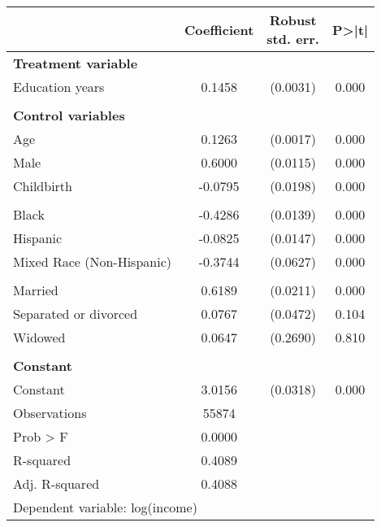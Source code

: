 {
\def\sym#1{\ifmmode^{#1}\else\(^{#1}\)\fi}
\begin{tabular}{l*{1}{ccc}}
\toprule
                    & Coefficient&\shortstack{Robust\\std. err.}&       P>|t|\\
\midrule
\textbf{Treatment variable}&            &            &            \\
Education years     &      0.1458&    (0.0031)&       0.000\\
\\ \textbf{Control variables}&            &            &            \\
Age                 &      0.1263&    (0.0017)&       0.000\\
Male                &      0.6000&    (0.0115)&       0.000\\
Childbirth          &     -0.0795&    (0.0198)&       0.000\\
                    &            &            &            \\
Black               &     -0.4286&    (0.0139)&       0.000\\
Hispanic            &     -0.0825&    (0.0147)&       0.000\\
Mixed Race (Non-Hispanic)&     -0.3744&    (0.0627)&       0.000\\
                    &            &            &            \\
Married             &      0.6189&    (0.0211)&       0.000\\
Separated or divorced&      0.0767&    (0.0472)&       0.104\\
Widowed             &      0.0647&    (0.2690)&       0.810\\
\\ \textbf{Constant}&            &            &            \\
Constant            &      3.0156&    (0.0318)&       0.000\\
\midrule
Observations        &       55874&            &            \\
Prob > F            &      0.0000&            &            \\
R-squared           &      0.4089&            &            \\
Adj. R-squared      &      0.4088&            &            \\
\bottomrule
\multicolumn{4}{l}{\footnotesize Dependent variable: log(income)}\\
\end{tabular}
}
